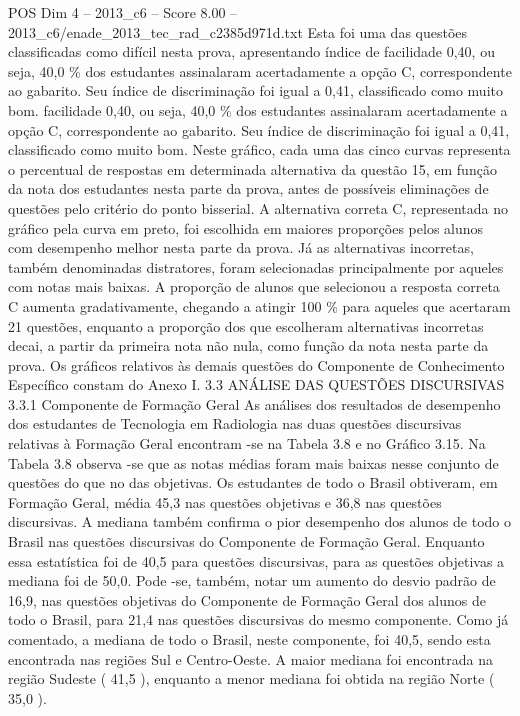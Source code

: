 \begin{textsample}{POS Dim 4 – 2013\_c6 – Score 8.00 – 2013\_c6/enade\_2013\_tec\_rad\_c2385d971d.txt}
Esta foi uma das questões classificadas como difícil nesta prova, apresentando índice de facilidade 0,40, ou seja, 40,0 \% dos estudantes assinalaram acertadamente a opção C, correspondente ao gabarito.
Seu índice de discriminação foi igual a 0,41, classificado como muito bom. facilidade 0,40, ou seja, 40,0 \% dos estudantes assinalaram acertadamente a opção C, correspondente ao gabarito.
Seu índice de discriminação foi igual a 0,41, classificado como muito bom.
Neste gráfico, cada uma das cinco curvas representa o percentual de respostas em determinada alternativa da questão 15, em função da nota dos estudantes nesta parte da prova, antes de possíveis eliminações de questões pelo critério do ponto bisserial.
A alternativa correta C, representada no gráfico pela curva em preto, foi escolhida em maiores proporções pelos alunos com desempenho melhor nesta parte da prova.
Já as alternativas incorretas, também denominadas distratores, foram selecionadas principalmente por aqueles com notas mais baixas.
A proporção de alunos que selecionou a resposta correta C aumenta gradativamente, chegando a atingir 100 \% para aqueles que acertaram 21 questões, enquanto a proporção dos que escolheram alternativas incorretas decai, a partir da primeira nota não nula, como função da nota nesta parte da prova.
Os gráficos relativos às demais questões do Componente de Conhecimento Específico constam do Anexo I. 3.3 ANÁLISE DAS QUESTÕES DISCURSIVAS 3.3.1 Componente de Formação Geral As análises dos resultados de desempenho dos estudantes de Tecnologia em Radiologia nas duas questões discursivas relativas à Formação Geral encontram -se na Tabela 3.8 e no Gráfico 3.15.
Na Tabela 3.8 observa -se que as notas médias foram mais baixas nesse conjunto de questões do que no das objetivas.
Os estudantes de todo o Brasil obtiveram, em Formação Geral, média 45,3 nas questões objetivas e 36,8 nas questões discursivas.
A mediana também confirma o pior desempenho dos alunos de todo o Brasil nas questões discursivas do Componente de Formação Geral.
Enquanto essa estatística foi de 40,5 para questões discursivas, para as questões objetivas a mediana foi de 50,0.
Pode -se, também, notar um aumento do desvio padrão de 16,9, nas questões objetivas do Componente de Formação Geral dos alunos de todo o Brasil, para 21,4 nas questões discursivas do mesmo componente.
Como já comentado, a mediana de todo o Brasil, neste componente, foi 40,5, sendo esta encontrada nas regiões Sul e Centro-Oeste.
A maior mediana foi encontrada na região Sudeste ( 41,5 ), enquanto a menor mediana foi obtida na região Norte ( 35,0 ).

\end{textsample}
